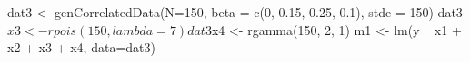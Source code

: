 \begin{Schunk}
\begin{Sinput}
 dat3 <- genCorrelatedData(N=150, beta = c(0, 0.15, 0.25, 0.1), stde = 150)
 dat3$x3 <- rpois(150, lambda = 7)
 dat3$x4 <- rgamma(150, 2, 1)
 m1 <- lm(y ~ x1 + x2 + x3 + x4, data=dat3)
\end{Sinput}
\end{Schunk}
